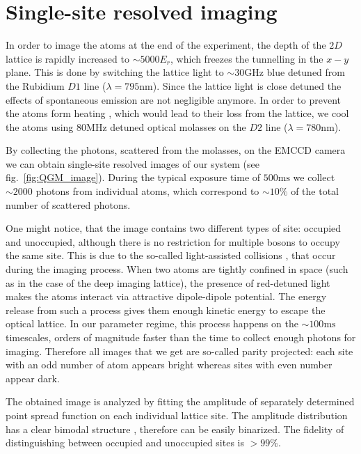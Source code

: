 \section{Single-site resolved imaging}
In order to image the atoms at the end of the experiment, the depth of the $2D$ lattice is rapidly increased to $\sim 5000 E_r$, which freezes the tunnelling in the $x-y$ plane. This is done by switching the lattice light to $\sim 30\mathrm{GHz}$ blue detuned from the Rubidium $D1$ line ($\lambda = 795\mathrm{nm}$). Since the lattice light is close detuned the effects of spontaneous emission are not negligible anymore. In order to prevent the atoms form heating \cite{Phys. Rev. A 82, 013615 (2010),Phys. Rev. A 82, 063605 (2010)}, which would lead to their loss from the lattice, we cool the atoms using $80\mathrm{MHz}$ detuned optical molasses on the $D2$ line ($\lambda = 780\mathrm{nm}$). 

By collecting the photons, scattered from the molasses, on the EMCCD camera we can obtain single-site resolved images of our system (see fig.~\ref{fig:QGM_image}). During the typical exposure time of $500 \mathrm{ms}$ we collect $\sim 2000$ photons from individual atoms, which correspond to $\sim 10\%$ of the total number of scattered photons. 

One might notice, that the image contains two different types of site: occupied and unoccupied, although there is no restriction for multiple bosons to occupy the same site. This is due to the so-called light-assisted collisions \cite{Adv. At., Mol., Opt. Phys. 34, 125 (1994), Nature Phys. 6, 951 (2010)}, that occur during the imaging process. When two atoms are tightly confined in space (such as in the case of the deep imaging lattice), the presence of red-detuned light makes the atoms interact via attractive dipole-dipole potential. The energy release from such a process gives them enough kinetic energy to escape the optical lattice. In our parameter regime, this process happens on the $\sim100 \mathrm{ms}$ timescales, orders of magnitude faster than the time to collect enough photons for imaging. Therefore all images that we get are so-called parity projected: each site with an odd number of atom appears bright whereas sites with even number appear dark. 

The obtained image is analyzed by fitting the amplitude of separately determined point spread function on each individual lattice site. The amplitude distribution has a clear bimodal structure \cite{Bakr2009}, therefore can be easily binarized. The fidelity of distinguishing between occupied and unoccupied sites is $>99\%$.